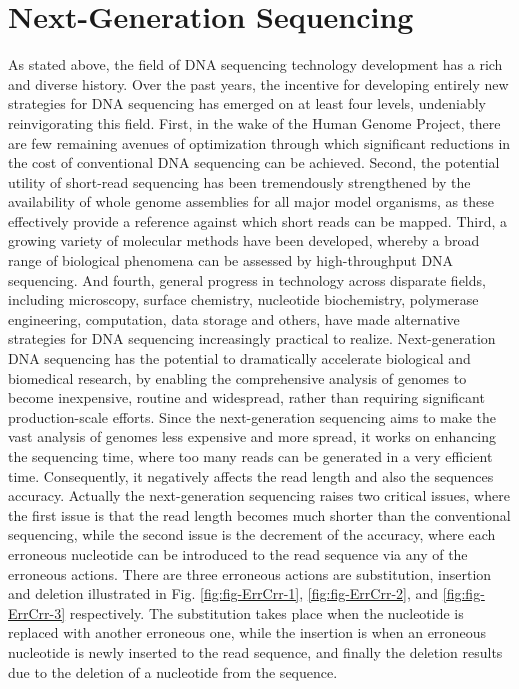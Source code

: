 \documentclass[12pt]{llncs}
\begin{document}
\newpage
\section{Next-Generation Sequencing}
As stated above, the field of DNA sequencing technology development has a rich and diverse history. Over the past years, the incentive for developing entirely new strategies for DNA sequencing has emerged on at least four levels, undeniably reinvigorating this field. First, in the wake of the Human Genome Project, there are few remaining avenues of optimization through which significant reductions in the cost of conventional DNA sequencing can be achieved. Second, the potential utility of short-read sequencing has been tremendously strengthened by the availability of whole genome assemblies for all major model organisms, as these effectively provide a reference against which short reads can be mapped. Third, a growing variety of molecular methods have been developed, whereby a broad range of biological phenomena can be assessed by high-throughput DNA sequencing. And fourth, general progress in technology across disparate fields, including microscopy, surface chemistry, nucleotide biochemistry, polymerase engineering, computation, data storage and others, have made alternative strategies for DNA sequencing increasingly practical to realize. Next-generation DNA sequencing has the potential to dramatically accelerate biological and biomedical research, by enabling the comprehensive analysis of genomes to become inexpensive, routine and widespread, rather than requiring significant production-scale efforts. Since the next-generation sequencing aims to make the vast analysis of genomes less expensive and more spread, it works on enhancing the sequencing time, where too many reads can be generated in a very efficient time. Consequently, it negatively affects the read length and also the sequences accuracy. Actually the next-generation sequencing raises two critical issues, where the first issue is that the read length becomes much shorter than the conventional sequencing, while the second issue is the decrement of the accuracy, where each erroneous nucleotide can be introduced to the read sequence via any of the erroneous actions. There are three erroneous actions are substitution, insertion and deletion illustrated in Fig. \ref{fig:fig-ErrCrr-1}, \ref{fig:fig-ErrCrr-2}, and \ref{fig:fig-ErrCrr-3} respectively. The substitution takes place when the nucleotide is replaced with another erroneous one, while the insertion is when an erroneous nucleotide is newly inserted to the read sequence, and finally the deletion results due to the deletion of a nucleotide from the sequence.
\end{document}
